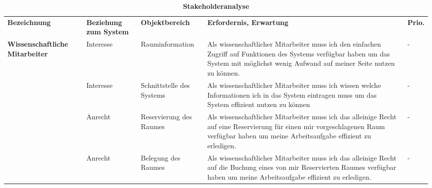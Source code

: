 \begin{table}[h]
	
 	\caption{\textbf{Stakeholderanalyse}}
 	\begin{tabularx}{\textwidth}{|X|X|X|X|m{}|}			
 		\rowcolor{heading}\textbf{Bezeichnung} & \textbf{Beziehung zum System} & \textbf{Objektbereich} & \textbf{Erfordernis, Erwartung} & \textbf{Prio.}\\
			 
 	\textbf{Wissenschaftliche Mitarbeiter} & Interesse & Rauminformation & Als wissenschaftlicher Mitarbeiter muss ich den einfachen Zugriff auf Funktionen des Systems verfügbar haben um das System mit möglichst wenig Aufwand auf meiner Seite nutzen zu können. & -\\
\rowcolor{odd}		 & Interesse & Schnittstelle des Systems & Als wissenschaftlicher Mitarbeiter muss ich wissen welche Informationen ich in das System eintragen muss um das System effizient nutzen zu können & -\\
	& Anrecht & Reservierung des Raumes & Als wissenschaftlicher Mitarbeiter muss ich das alleinige Recht auf eine Reservierung für einen mir vorgeschlagenen Raum verfügbar haben um meine Arbeitsaufgabe effizient zu erledigen. & -\\
\rowcolor{odd} & Anrecht & Belegung des Raumes & Als wissenschaftlicher Mitarbeiter muss ich das alleinige Recht auf die Buchung eines von mir Reservierten Raumes verfügbar haben um meine Arbeitsaufgabe effizient zu erledigen. & -\\ \hline
 	\end{tabularx}
 	
\end{table}

